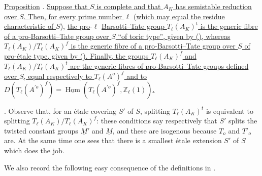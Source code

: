 \medskip
\noindent
\underline{Proposition} . \underline{Suppose that $S$ is complete
and that $A_K$ has semistable reduction over $S$. Then, for every
prime number $\ell$} (\underline{which may equal the residue characteristic of
$S$}), \underline{the pro}-$\ell$ \underline{Barsotti--Tate group $T_\ell(A_K)^t$ is the
generic fibre of a pro-Barsotti--Tate group over $S$ ``of toric
type'', given by (), whereas
$T_\ell(A_K)/T_\ell(A_K)^f$ is the generic fibre of a
pro-Barsotti--Tate group over $S$ of pro-\'{e}tale type, given by
(). Finally, the groups $T_\ell(A_K)^f$ and
$T_\ell(A_K)/T_\ell(A_K)^t$ are the generic fibres of
pro-Barsotti--Tate groups defined over $S$, equal respectively to
$T_\ell(A^o)^f$ and to
$D(T_\ell(A^{\prime o})^f)=
\underline{\operatorname{Hom}}(T_\ell(A^{\prime o})^f,
\mathbb Z_\ell(1))$.}

\medskip
\noindent
{}. Observe that, for an \'{e}tale covering $S'$ of $S$, splitting
$T_\ell(A_K)^t$ is equivalent to splitting
$T_\ell(A_K)/T_\ell(A_K)^f$: these conditions say respectively that
$S'$ splits the twisted constant groups $\underline M'$ and
$\underline M$, and these are isogenous because $T_o$ and $T'_o$
are. At the same time one sees that there is a smallest \'{e}tale
extension $S'$ of $S$ which does the job.

We also record the following easy consequence of the definitions in
.
